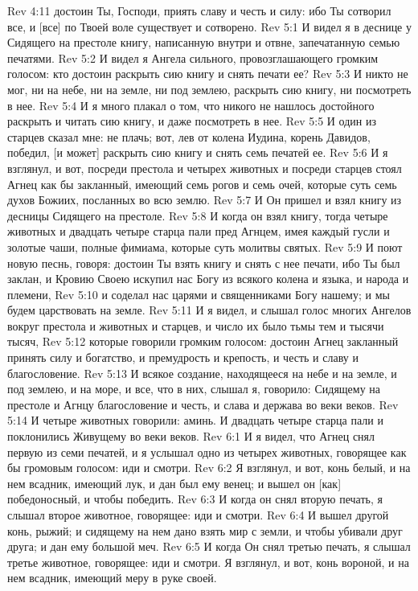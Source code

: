 Rev 4:11  достоин Ты, Господи, приять славу и честь и силу: ибо Ты сотворил все, и [все] по Твоей воле существует и сотворено.
Rev 5:1  И видел я в деснице у Сидящего на престоле книгу, написанную внутри и отвне, запечатанную семью печатями.
Rev 5:2  И видел я Ангела сильного, провозглашающего громким голосом: кто достоин раскрыть сию книгу и снять печати ее?
Rev 5:3  И никто не мог, ни на небе, ни на земле, ни под землею, раскрыть сию книгу, ни посмотреть в нее.
Rev 5:4  И я много плакал о том, что никого не нашлось достойного раскрыть и читать сию книгу, и даже посмотреть в нее.
Rev 5:5  И один из старцев сказал мне: не плачь; вот, лев от колена Иудина, корень Давидов, победил, [и может] раскрыть сию книгу и снять семь печатей ее.
Rev 5:6  И я взглянул, и вот, посреди престола и четырех животных и посреди старцев стоял Агнец как бы закланный, имеющий семь рогов и семь очей, которые суть семь духов Божиих, посланных во всю землю.
Rev 5:7  И Он пришел и взял книгу из десницы Сидящего на престоле.
Rev 5:8  И когда он взял книгу, тогда четыре животных и двадцать четыре старца пали пред Агнцем, имея каждый гусли и золотые чаши, полные фимиама, которые суть молитвы святых.
Rev 5:9  И поют новую песнь, говоря: достоин Ты взять книгу и снять с нее печати, ибо Ты был заклан, и Кровию Своею искупил нас Богу из всякого колена и языка, и народа и племени,
Rev 5:10  и соделал нас царями и священниками Богу нашему; и мы будем царствовать на земле.
Rev 5:11  И я видел, и слышал голос многих Ангелов вокруг престола и животных и старцев, и число их было тьмы тем и тысячи тысяч,
Rev 5:12  которые говорили громким голосом: достоин Агнец закланный принять силу и богатство, и премудрость и крепость, и честь и славу и благословение.
Rev 5:13  И всякое создание, находящееся на небе и на земле, и под землею, и на море, и все, что в них, слышал я, говорило: Сидящему на престоле и Агнцу благословение и честь, и слава и держава во веки веков.
Rev 5:14  И четыре животных говорили: аминь. И двадцать четыре старца пали и поклонились Живущему во веки веков.
Rev 6:1  И я видел, что Агнец снял первую из семи печатей, и я услышал одно из четырех животных, говорящее как бы громовым голосом: иди и смотри.
Rev 6:2  Я взглянул, и вот, конь белый, и на нем всадник, имеющий лук, и дан был ему венец; и вышел он [как] победоносный, и чтобы победить.
Rev 6:3  И когда он снял вторую печать, я слышал второе животное, говорящее: иди и смотри.
Rev 6:4  И вышел другой конь, рыжий; и сидящему на нем дано взять мир с земли, и чтобы убивали друг друга; и дан ему большой меч.
Rev 6:5  И когда Он снял третью печать, я слышал третье животное, говорящее: иди и смотри. Я взглянул, и вот, конь вороной, и на нем всадник, имеющий меру в руке своей.
